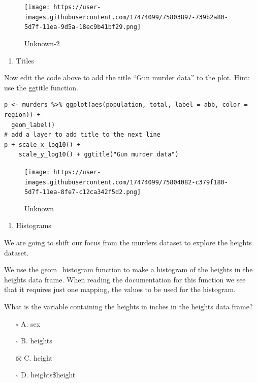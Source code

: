 \documentclass[
]{article}
\providecommand{\tightlist}{%
  \setlength{\itemsep}{0pt}\setlength{\parskip}{0pt}}
\begin{document}
\begin{figure}
\centering
\texttt{[image: https://user-images.githubusercontent.com/17474099/75803897-739b2a80-5d7f-11ea-9d5a-18ec9b41bf29.png]}
\caption{Unknown-2}
\end{figure}

\begin{enumerate}
\def\labelenumi{\arabic{enumi}.}
\setcounter{enumi}{13}
\tightlist
\item
  Titles
\end{enumerate}

Now edit the code above to add the title ``Gun murder data'' to the
plot. Hint: use the ggtitle function.

\begin{verbatim}
p <- murders %>% ggplot(aes(population, total, label = abb, color = region)) +
  geom_label()
# add a layer to add title to the next line
p + scale_x_log10() + 
    scale_y_log10() + ggtitle("Gun murder data")
\end{verbatim}

\begin{figure}
\centering
\texttt{[image: https://user-images.githubusercontent.com/17474099/75804082-c379f180-5d7f-11ea-8fe7-c12ca342f5d2.png]}
\caption{Unknown}
\end{figure}

\begin{enumerate}
\def\labelenumi{\arabic{enumi}.}
\setcounter{enumi}{14}
\tightlist
\item
  Histograms
\end{enumerate}

We are going to shift our focus from the murders dataset to explore the
heights dataset.

We use the geom\_histogram function to make a histogram of the heights
in the heights data frame. When reading the documentation for this
function we see that it requires just one mapping, the values to be used
for the histogram.

What is the variable containing the heights in inches in the heights
data frame?

\begin{itemize}
\tightlist
\item[$\square$]
  A. sex
\item[$\square$]
  B. heights
\item[$\boxtimes$]
  C. height
\item[$\square$]
  D. heights\$height
\end{itemize}
\end{document}
